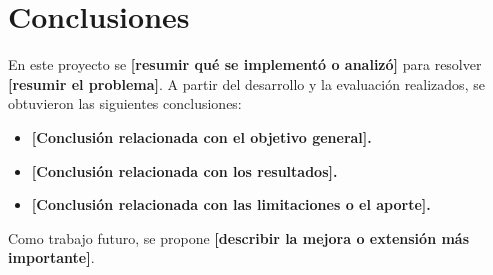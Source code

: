 \section{Conclusiones}
\label{sec:conclusiones}

En este proyecto se \textbf{[resumir qué se implementó o analizó]} para
resolver \textbf{[resumir el problema]}. A partir del desarrollo y la
evaluación realizados, se obtuvieron las siguientes conclusiones:

\begin{itemize}
    \item \textbf{[Conclusión relacionada con el objetivo general].}
    \item \textbf{[Conclusión relacionada con los resultados].}
    \item \textbf{[Conclusión relacionada con las limitaciones o el aporte].}
\end{itemize}

Como trabajo futuro, se propone \textbf{[describir la mejora o extensión más
importante]}.
